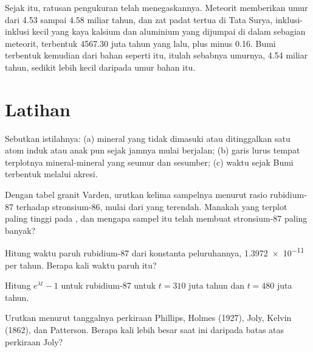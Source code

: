 Sejak itu, ratusan pengukuran telah menegaskannya. Meteorit memberikan umur
dari 4.53 sampai 4.58 miliar tahun, dan zat padat tertua di Tata Surya,
inklusi-inklusi kecil yang kaya kalsium dan aluminium yang dijumpai di dalam
sebagian meteorit, terbentuk \num{4567.30} juta tahun yang lalu, plus minus
0.16. Bumi terbentuk kemudian dari bahan seperti itu, itulah sebabnya umurnya,
4.54 miliar tahun, sedikit lebih kecil daripada umur bahan itu.

\section{Latihan}

\begin{exercise}[$\star$]\label{exo:g12:age-of-the-earth:1}
Sebutkan istilahnya: (a) mineral yang tidak dimasuki atau ditinggalkan satu
atom induk atau anak pun sejak jamnya mulai berjalan; (b) garis lurus tempat
terplotnya mineral-mineral yang seumur dan sesumber; (c) waktu sejak Bumi
terbentuk melalui akresi.
\end{exercise}

\begin{exercise}[$\star$]\label{exo:g12:age-of-the-earth:2}
Dengan tabel granit Varden, urutkan kelima sampelnya menurut rasio rubidium-87
terhadap stronsium-86, mulai dari yang terendah. Manakah yang terplot paling
tinggi pada , dan mengapa sampel itu telah membuat stronsium-87 paling
banyak?
\end{exercise}

\begin{exercise}[$\star$]\label{exo:g12:age-of-the-earth:3}
Hitung waktu paruh rubidium-87 dari konstanta peluruhannya,
\num{1.3972e-11} per tahun. Berapa kali  waktu paruh itu?
\end{exercise}

\begin{exercise}[$\star$]\label{exo:g12:age-of-the-earth:4}
Hitung $e^{\lambda t} - 1$ untuk rubidium-87 untuk $t = 310$ juta tahun dan
$t = 480$ juta tahun.
\end{exercise}

\begin{exercise}[$\star$]\label{exo:g12:age-of-the-earth:5}
Urutkan menurut tanggalnya perkiraan Phillips, Holmes (1927), Joly, Kelvin
(1862), dan Patterson. Berapa kali lebih besar  saat ini daripada
batas atas perkiraan Joly?
\end{exercise}

